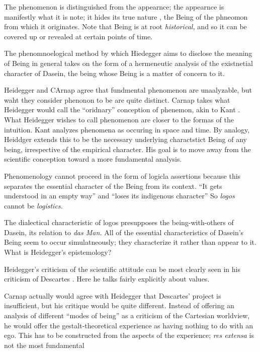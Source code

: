 \documentclass[leqno, 12pt]{turabian-researchpaper}
\begin{document}
	The phenomenon is distinguished from the appearnce; the appearnce is
	manifestly what it is note; it hides its true nature , the Being of the phneomon
	from which it originates. Note that Being is at root \emph{historical,} and so
	it can be covered up or revealed at certain points of time.

	The phenomnoelogical method by which Hiedegger aims to disclose the meaning of
	Being in general takes on the form of a hermeneutic analysis of the existnetial
	character of Dasein, the being whose Being is a matter of concern to it.

	Heidegger and CArnap agree that fundmental phenomenon are unaalyzable, but waht
	they consider phenonon to be are quite distinct. Carnap takes what Heidegger
	would call the \enquote{oridnary} conception of phenemon, akin to Kant
	\autocite[p54]{heidegger2008b}. What Heidegger wishes to call phenomenon are closer
	to the formas of the intuition. Kant analyzes phenomena as occuring in space
	and time. By analogy, Heiddger extends this to be the necessary underlying
	charactstict Being of any being, irrespective of the empirical character. His
	goal is to move away from the scientific conception toward a more fundamental
	analysis.

	Phenomenology cannot proceed in the form of logicla assertions because this
	separates the essential character of the Being from its context. \enquote{It gets understood in an empty way}
	and \enquote{loses its indigenous character} \autocite[p61.]{heidegger2008b}
	So \emph{logos} cannot be \emph{logistics.}

	The dialectical characteristic of logos presupposes the being-with-others of Dasein,
	its relation to \emph{das Man.} All of the essential characteristics of Dasein's
	Being seem to occur simulatneously; they characterize it rather than appear to
	it. What is Heidegger's epistemology?

	Heidegger's criticism of the scientific attitude can be most clearly seen in his
	criticism of Descartes \autocite[{I.3 B, especially \P21}]{heidegger2008b}.
	Here he talks fairly explicitly about values.

	Carnap actually would agree with Heidegger that Descartes' project is insufficient,
	but his critique would be quite different. Instead of offering an analysis of different
	\enquote{modes of being} as a criticism of the Cartesian worldview, he would offer
	the gestalt-theoretical experience as having nothing to do with an ego. This
	has to be constructed from the aspects of the experience; \textit{res extensa}
	is not the most fundamental
\end{document}
